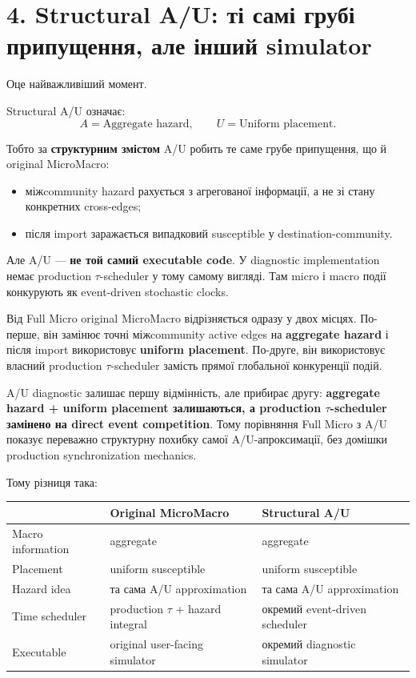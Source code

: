 \documentclass[11pt,a4paper]{article}
\begin{document}
\section*{4. Structural A/U: ті самі грубі припущення, але інший simulator}

Оце найважливіший момент.

Structural A/U означає:
\[
 \boxed{A=\text{Aggregate hazard}},\qquad
 \boxed{U=\text{Uniform placement}}.
\]

Тобто за \textbf{структурним змістом} A/U робить те саме грубе припущення, що й original MicroMacro:
\begin{itemize}[nosep]
\item міжcommunity hazard рахується з агрегованої інформації, а не зі стану конкретних cross-edges;
\item після import заражається випадковий susceptible у destination-community.
\end{itemize}

Але A/U --- \textbf{не той самий executable code}. У diagnostic implementation немає production $\tau$-scheduler у тому самому вигляді. Там micro і macro події конкурують як event-driven stochastic clocks.

\begin{tcolorbox}[colback=soft,colframe=boundary,title=Навіщо взагалі потрібен A/U diagnostic?]
Від Full Micro original MicroMacro відрізняється одразу у двох місцях. По-перше, він замінює точні міжcommunity active edges на \textbf{aggregate hazard} і після import використовує \textbf{uniform placement}. По-друге, він використовує власний production $\tau$-scheduler замість прямої глобальної конкуренції подій.

A/U diagnostic залишає першу відмінність, але прибирає другу: \textbf{aggregate hazard + uniform placement залишаються, а production $\tau$-scheduler замінено на direct event competition}. Тому порівняння Full Micro з A/U показує переважно структурну похибку самої A/U-апроксимації, без домішки production synchronization mechanics.
\end{tcolorbox}

Тому різниця така:

\begin{center}
\begin{tabular}{>{\raggedright\arraybackslash}p{42mm} >{\raggedright\arraybackslash}p{52mm} >{\raggedright\arraybackslash}p{52mm}}
\toprule
 & \textbf{Original MicroMacro} & \textbf{Structural A/U}\\
\midrule
Macro information & aggregate & aggregate\\
Placement & uniform susceptible & uniform susceptible\\
Hazard idea & та сама A/U approximation & та сама A/U approximation\\
Time scheduler & production $\tau$ + hazard integral & окремий event-driven scheduler\\
Executable & original user-facing simulator & окремий diagnostic simulator\\
\bottomrule
\end{tabular}
\end{center}
\end{document}
